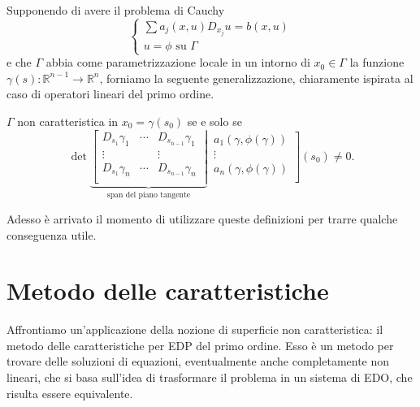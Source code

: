 Supponendo di avere il problema di Cauchy
\begin{equation}
\begin{cases}
\sum a_j(x,u)D_{x_j} u = b(x,u)\\
u = \phi \text{ su } \Gamma
\end{cases}
\end{equation}
e che $\Gamma$ abbia come parametrizzazione locale in un intorno di $x_0\in \Gamma$ la funzione $\gamma (s): \mathbb{R}^{n-1}\rightarrow \mathbb{R}^n$, forniamo la seguente generalizzazione, chiaramente ispirata al caso di operatori lineari del primo ordine.
\begin{definition}
$\Gamma$ non caratteristica in $x_0=\gamma (s_0)$ se e solo se\\
\begin{equation*}
\det
\underbrace{
\left[
\begin{matrix}
D_{s_1}\gamma_1 & \cdots & D_{s_{n-1}}\gamma_1 \\
\vdots &  & \vdots \\
D_{s_1}\gamma_n & \cdots & D_{s_{n-1}}\gamma_n \\
\end{matrix}\;\right|}_{\text{span del piano tangente}} \,
\left.
\begin{matrix}
a_1(\gamma, \phi(\gamma))\\
\vdots\\
a_n(\gamma, \phi(\gamma))\\
\end{matrix}\right] (s_0) \neq 0.
\end{equation*}
\end{definition}
Adesso è arrivato il momento di utilizzare queste definizioni per trarre qualche conseguenza utile.

\newpage
\section{Metodo delle caratteristiche}
Affrontiamo un'applicazione della nozione di superficie non caratteristica: il metodo delle caratteristiche per EDP del primo ordine. 
Esso è un metodo per trovare delle soluzioni di equazioni, eventualmente anche completamente non lineari, che si basa sull'idea di trasformare il problema in un sistema di EDO, che risulta essere equivalente. 

